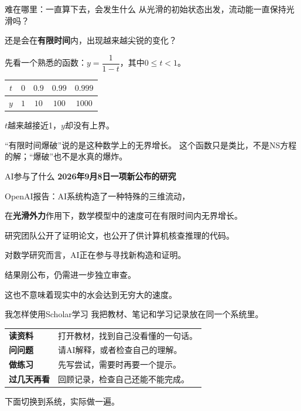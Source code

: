 \documentclass[aspectratio=169,10pt]{beamer}
\newcommand{\key}[1]{{\color{campusgreen}\bfseries #1}}
\newcommand{\smallbody}{\fontsize{11}{15}\selectfont}
\begin{document}
\begin{frame}[t,label=nsquestion]{难在哪里：一直算下去，会发生什么}
  \smallbody
  从光滑的初始状态出发，流动能一直保持光滑吗？\par
  还是会在\key{有限时间}内，出现越来越尖锐的变化？
  \par\vspace{4mm}
  先看一个熟悉的函数：$y=\dfrac{1}{1-t}$，其中$0\le t<1$。
  \par\vspace{3mm}
  \begin{center}
  \renewcommand{\arraystretch}{1.35}
  \setlength{\tabcolsep}{7mm}
  \begin{tabular}{c|cccc}
    $t$ & $0$ & $0.9$ & $0.99$ & $0.999$\\\hline
    $y$ & $1$ & $10$ & $100$ & $1000$
  \end{tabular}
  \end{center}
  \par\vspace{3mm}
  $t$越来越接近1，$y$却没有上界。\par
  “有限时间爆破”说的是这种数学上的无界增长。
  \vfill
  {\fontsize{9}{12}\selectfont 这个函数只是类比，不是NS方程的解；“爆破”也不是水真的爆炸。}
\end{frame}

\begin{frame}[t,label=nsprogress]{AI参与了什么}
  \smallbody
  \key{2026年9月8日\quad 一项新公布的研究}
  \par\vspace{4mm}
  OpenAI报告：AI系统构造了一种特殊的三维流动，\par
  在\textbf{光滑外力}作用下，数学模型中的速度可在有限时间内无界增长。
  \par\vspace{5mm}
  研究团队公开了证明论文，也公开了供计算机核查推理的代码。
  \par\vspace{5mm}
  对数学研究而言，AI正在参与寻找新构造和证明。
  \vfill
  {\fontsize{10}{14}\selectfont 结果刚公布，仍需进一步独立审查。\par
  这也不意味着现实中的水会达到无穷大的速度。}
\end{frame}

\begin{frame}[t]{我怎样使用Scholar学习}
  我把教材、笔记和学习记录放在同一个系统里。
  \par\vspace{7mm}
  \begin{tabular}{@{}lp{109mm}@{}}
    \key{读资料} & 打开教材，找到自己没看懂的一句话。\\[5mm]
    \key{问问题} & 请AI解释，或者检查自己的理解。\\[5mm]
    \key{做练习} & 先写尝试，需要时再要一个提示。\\[5mm]
    \key{过几天再看} & 回顾记录，检查自己还能不能完成。\\
  \end{tabular}
  \vfill
  下面切换到系统，实际做一遍。
\end{frame}
\end{document}
